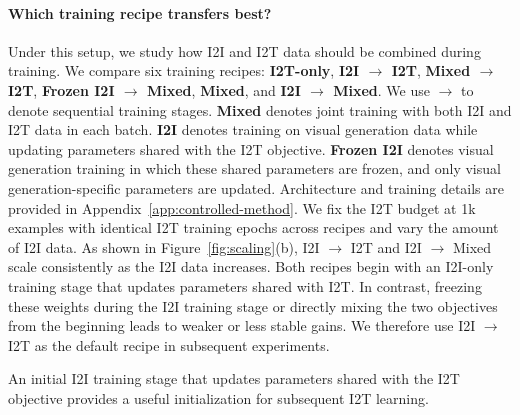 \paragraph{Which training recipe transfers best?}
Under this setup, we study how I2I and I2T data should be combined during training. 
We compare six training recipes: \textbf{I2T-only}, \textbf{I2I $\rightarrow$ I2T}, \textbf{Mixed $\rightarrow$ I2T}, \textbf{Frozen I2I $\rightarrow$ Mixed}, \textbf{Mixed}, and \textbf{I2I $\rightarrow$ Mixed}.
We use $\rightarrow$ to denote sequential training stages.
\textbf{Mixed} denotes joint training with both I2I and I2T data in each batch.
\textbf{I2I} denotes training on visual generation data while updating parameters shared with the I2T objective.
\textbf{Frozen I2I} denotes visual generation training in which these shared parameters are frozen, and only visual generation-specific parameters are updated.
Architecture and training details are provided in Appendix~\ref{app:controlled-method}.
We fix the I2T budget at 1k examples with identical I2T training epochs across recipes and vary the amount of I2I data.
As shown in Figure~\ref{fig:scaling}(b), I2I $\rightarrow$ I2T and I2I $\rightarrow$ Mixed scale consistently as the I2I data increases.
Both recipes begin with an I2I-only training stage that updates parameters shared with I2T.
In contrast, freezing these weights during the I2I training stage or directly mixing the two objectives from the beginning leads to weaker or less stable gains.
We therefore use I2I $\rightarrow$ I2T as the default recipe in subsequent experiments.
\begin{findingbox}
An initial I2I training stage that updates parameters shared with the I2T objective provides a useful initialization for subsequent I2T learning.
\end{findingbox}
